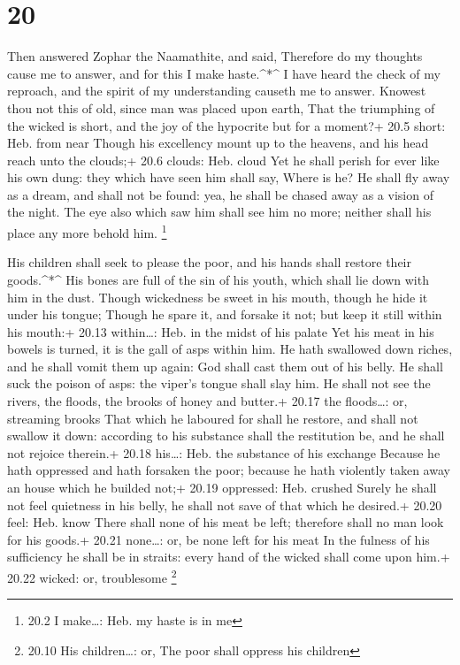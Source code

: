 \hypertarget{section-19}{%
\section{20}\label{section-19}}

 Then answered Zophar the Naamathite, and said, 
Therefore do my thoughts cause me to answer, and for this I make
haste.\^{}*\^{}  I have heard the check of my reproach, and
the spirit of my understanding causeth me to answer. 
Knowest thou not this of old, since man was placed upon earth,
 That the triumphing of the wicked is short, and the joy of
the hypocrite but for a moment?+ 20.5 short: Heb. from near 
Though his excellency mount up to the heavens, and his head reach unto
the clouds;+ 20.6 clouds: Heb. cloud  Yet he shall perish
for ever like his own dung: they which have seen him shall say, Where is
he?  He shall fly away as a dream, and shall not be found:
yea, he shall be chased away as a vision of the night.  The
eye also which saw him shall see him no more; neither shall his place
any more behold him. \footnote{20.2 I make\ldots: Heb. my haste is in me}

 His children shall seek to please the poor, and his hands
shall restore their goods.\^{}*\^{}  His bones are full of
the sin of his youth, which shall lie down with him in the dust.
 Though wickedness be sweet in his mouth, though he hide it
under his tongue;  Though he spare it, and forsake it not;
but keep it still within his mouth:+ 20.13 within\ldots: Heb. in the
midst of his palate  Yet his meat in his bowels is turned,
it is the gall of asps within him.  He hath swallowed down
riches, and he shall vomit them up again: God shall cast them out of his
belly.  He shall suck the poison of asps: the viper's
tongue shall slay him.  He shall not see the rivers, the
floods, the brooks of honey and butter.+ 20.17 the floods\ldots: or,
streaming brooks  That which he laboured for shall he
restore, and shall not swallow it down: according to his substance shall
the restitution be, and he shall not rejoice therein.+ 20.18 his\ldots:
Heb. the substance of his exchange  Because he hath
oppressed and hath forsaken the poor; because he hath violently taken
away an house which he builded not;+ 20.19 oppressed: Heb. crushed
 Surely he shall not feel quietness in his belly, he shall
not save of that which he desired.+ 20.20 feel: Heb. know 
There shall none of his meat be left; therefore shall no man look for
his goods.+ 20.21 none\ldots: or, be none left for his meat
 In the fulness of his sufficiency he shall be in straits:
every hand of the wicked shall come upon him.+ 20.22 wicked: or,
troublesome \footnote{20.10 His children\ldots: or, The poor shall
  oppress his children}


